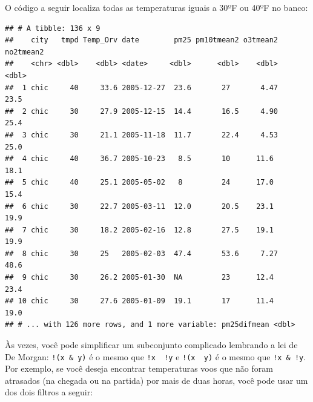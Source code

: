\documentclass[a4paper]{book}
\newenvironment{Shaded}{\begin{snugshade}}{\end{snugshade}}
\newcommand{\DecValTok}[1]{\textcolor[rgb]{0.00,0.00,0.81}{#1}}
\newcommand{\KeywordTok}[1]{\textcolor[rgb]{0.13,0.29,0.53}{\textbf{#1}}}
\newcommand{\NormalTok}[1]{#1}
\newcommand{\OperatorTok}[1]{\textcolor[rgb]{0.81,0.36,0.00}{\textbf{#1}}}
\newcommand{\StringTok}[1]{\textcolor[rgb]{0.31,0.60,0.02}{#1}}
\begin{document}
O código a seguir localiza todas as temperaturas iguais a 30ºF ou 40ºF no banco:

\begin{Shaded}
\end{Shaded}

\begin{verbatim}
## # A tibble: 136 x 9
##    city   tmpd Temp_Orv date        pm25 pm10tmean2 o3tmean2 no2tmean2
##    <chr> <dbl>    <dbl> <date>     <dbl>      <dbl>    <dbl>     <dbl>
##  1 chic     40     33.6 2005-12-27  23.6       27       4.47      23.5
##  2 chic     30     27.9 2005-12-15  14.4       16.5     4.90      25.4
##  3 chic     30     21.1 2005-11-18  11.7       22.4     4.53      25.0
##  4 chic     40     36.7 2005-10-23   8.5       10      11.6       18.1
##  5 chic     40     25.1 2005-05-02   8         24      17.0       15.4
##  6 chic     30     22.7 2005-03-11  12.0       20.5    23.1       19.9
##  7 chic     30     18.2 2005-02-16  12.8       27.5    19.1       19.9
##  8 chic     30     25   2005-02-03  47.4       53.6     7.27      48.6
##  9 chic     30     26.2 2005-01-30  NA         23      12.4       23.4
## 10 chic     30     27.6 2005-01-09  19.1       17      11.4       19.0
## # ... with 126 more rows, and 1 more variable: pm25difmean <dbl>
\end{verbatim}

Às vezes, você pode simplificar um subconjunto complicado lembrando a lei de De Morgan: \texttt{!(x\ \&\ y)} é o mesmo que \texttt{!x\ \textbar{}\ !y} e \texttt{!(x\ \textbar{}\ y)} é o mesmo que \texttt{!x\ \&\ !y}. Por exemplo, se você deseja encontrar temperaturas voos que não foram atrasados (na chegada ou na partida) por mais de duas horas, você pode usar um dos dois filtros a seguir:

\begin{Shaded}
\end{Shaded}
\end{document}
